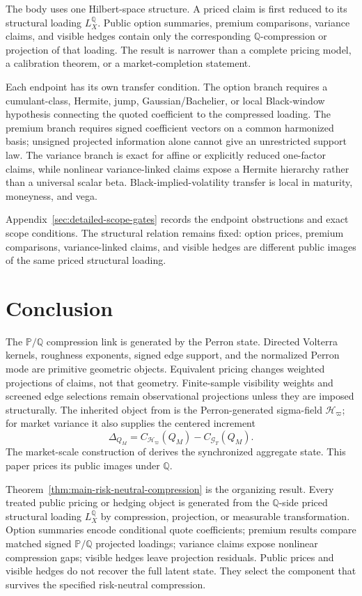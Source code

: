 \documentclass[11pt,a4paper]{amsart}
\theoremstyle{plain}
\theoremstyle{definition}
\theoremstyle{remark}
\newcommand{\PP}{\mathbb{P}}
\newcommand{\QQ}{\mathbb{Q}}
\newcommand{\cG}{\mathcal{G}}
\newcommand{\cH}{\mathcal{H}}
\begin{document}
The body uses one Hilbert-space structure.  A priced claim is first reduced to its structural
loading \(L_X^\QQ\).  Public option summaries, premium comparisons, variance claims, and visible
hedges contain only the corresponding \(\QQ\)-compression or projection of that loading.  The result
is narrower than a complete pricing model, a calibration theorem, or a market-completion statement.

Each endpoint has its own transfer condition.  The option branch requires a cumulant-class,
Hermite, jump, Gaussian/Bachelier, or local Black-window hypothesis connecting the quoted
coefficient to the compressed loading.  The premium branch requires signed coefficient vectors on a
common harmonized basis; unsigned projected information alone cannot give an unrestricted support
law.  The variance branch is exact for affine or explicitly reduced one-factor claims, while
nonlinear variance-linked claims expose a Hermite hierarchy rather than a universal scalar beta.
Black-implied-volatility transfer is local in maturity, moneyness, and vega.

Appendix~\ref{sec:detailed-scope-gates} records the endpoint obstructions and exact scope
conditions.  The structural relation remains fixed: option prices, premium comparisons,
variance-linked claims, and visible hedges are different public images of the same priced structural
loading.

\section{Conclusion}\label{sec:conclusion}

The \(\PP/\QQ\) compression link is generated by the Perron state.  Directed Volterra kernels,
roughness exponents, signed edge support, and the normalized Perron mode are primitive geometric
objects.  Equivalent pricing changes weighted projections of claims, not that geometry.
Finite-sample visibility weights and screened edge selections remain observational projections
unless they are imposed structurally.  The inherited object from \cite{vidal2026market} is the
Perron-generated sigma-field \(\cH_\varpi\); for market variance it also supplies the centered
increment
\[
        \Delta_{Q_M}
        =
        C_{\cH_\varpi}(Q_M)-C_{\cG_T}(Q_M).
\]
The market-scale construction of \cite{vidal2026market} derives the synchronized aggregate state.
This paper prices its public images under \(\QQ\).

Theorem~\ref{thm:main-risk-neutral-compression} is the organizing result.  Every treated public
pricing or hedging object is generated from the \(\QQ\)-side priced structural loading
\(L_X^\QQ\) by compression, projection, or measurable transformation.  Option summaries encode
conditional quote coefficients; premium results compare matched signed \(\PP/\QQ\) projected
loadings; variance claims expose nonlinear compression gaps; visible hedges leave projection
residuals.  Public prices and visible hedges do not recover the full latent state.  They select the
component that survives the specified risk-neutral compression.
\end{document}
